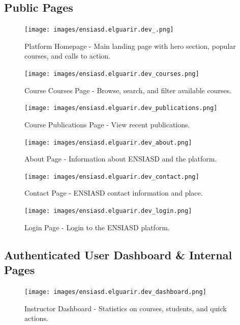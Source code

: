 \documentclass[12pt,a4paper]{article}
\begin{document}
\subsection{Public Pages}
\begin{figure}[H]
    \centering
    \texttt{[image: images/ensiasd.elguarir.dev\_.png]}
    \caption{Platform Homepage - Main landing page with hero section, popular courses, and calls to action.}
    \label{fig:screen-homepage}
\end{figure}
\FloatBarrier

\begin{figure}[H]
    \centering
    \texttt{[image: images/ensiasd.elguarir.dev\_courses.png]}
    \caption{Course Courses Page - Browse, search, and filter available courses.}
    \label{fig:screen-course-listing}
\end{figure}
\FloatBarrier

\begin{figure}[H]
    \centering
    \texttt{[image: images/ensiasd.elguarir.dev\_publications.png]}
    \caption{Course Publications Page - View recent publications.}
    \label{fig:screen-publications}
\end{figure}
\FloatBarrier

\begin{figure}[H]
    \centering
    \texttt{[image: images/ensiasd.elguarir.dev\_about.png]}
    \caption{About Page - Information about ENSIASD and the platform.}
    \label{fig:screen-about}
\end{figure}
\FloatBarrier

\begin{figure}[H]
    \centering
    \texttt{[image: images/ensiasd.elguarir.dev\_contact.png]}
    \caption{Contact Page - ENSIASD contact information and place.}
    \label{fig:screen-contact}
\end{figure}
\FloatBarrier

\begin{figure}[H]
    \centering
    \texttt{[image: images/ensiasd.elguarir.dev\_login.png]}
    \caption{Login Page - Login to the ENSIASD platform.}
    \label{fig:screen-login}
\end{figure}
\FloatBarrier
\clearpage

\subsection{Authenticated User Dashboard \& Internal Pages}

\begin{figure}[H]
    \centering
    \texttt{[image: images/ensiasd.elguarir.dev\_dashboard.png]}
    \caption{Instructor Dashboard - Statistics on courses, students, and quick actions.}
    \label{fig:screen-dashboard-instructor}
\end{figure}
\FloatBarrier
\end{document}
